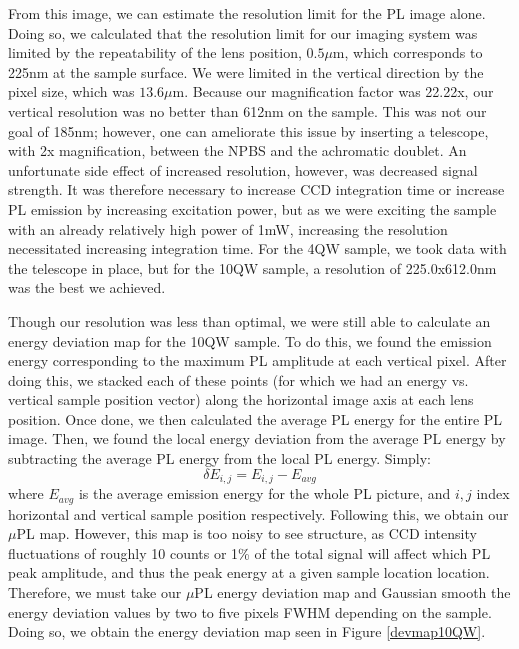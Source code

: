 \indent From this image, we can estimate the resolution limit for the PL image alone. Doing so, we calculated that the resolution limit for our imaging system was limited by the repeatability of the lens position, $0.5\mu$m, which corresponds to 225nm at the sample surface. We were limited in the vertical direction by the pixel size, which was $13.6\mu$m. Because our magnification factor was 22.22x, our vertical resolution was no better than 612nm on the sample. This was not our goal of 185nm; however, one can ameliorate this issue by inserting a telescope, with 2x magnification, between the NPBS and the achromatic doublet. An unfortunate side effect of increased resolution, however, was decreased signal strength. It was therefore necessary to increase CCD integration time or increase PL emission by increasing excitation power, but as we were exciting the sample with an already relatively high power of 1mW, increasing the resolution necessitated increasing integration time. For the 4QW sample, we took data with the telescope in place, but for the 10QW sample, a resolution of 225.0x612.0nm was the best we achieved.
 


\indent Though our resolution was less than optimal, we were still able to calculate an energy deviation map for the 10QW sample. To do this, we found the emission energy corresponding to the maximum PL amplitude at each vertical pixel. After doing this, we stacked each of these points (for which we had an energy vs. vertical sample position vector) along the horizontal image axis at each lens position. Once done, we then calculated the average PL energy for the entire PL image. Then, we found the local energy deviation from the average PL energy by subtracting the average PL energy from the local PL energy. Simply: 
\begin{equation}
\delta E_{i,j} = E_{i,j}-E_{avg}
\end{equation}
where $E_{avg}$ is the average emission energy for the whole PL picture, and $i,j$ index horizontal and vertical sample position respectively. Following this, we obtain our $\mu$PL map. However, this map is too noisy to see structure, as CCD intensity fluctuations of roughly 10 counts or 1\% of the total signal will affect which PL peak amplitude, and thus the peak energy at a given sample location location. Therefore, we must take our $\mu$PL energy deviation map and Gaussian smooth the energy deviation values by two to five pixels FWHM depending on the sample. Doing so, we obtain the energy deviation map seen in Figure \ref{devmap10QW}.

